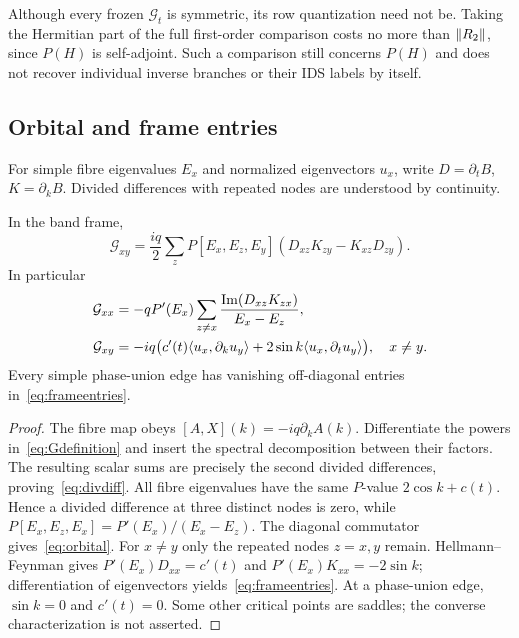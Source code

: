 Although every frozen $\mathcal G_t$ is symmetric, its row quantization need not be. Taking the Hermitian part of the full first-order comparison costs no more than $\lVert R_2\rVert$, since $P(H)$ is self-adjoint. Such a comparison still concerns $P(H)$ and does not recover individual inverse branches or their IDS labels by itself.

\subsection{Orbital and frame entries}
For simple fibre eigenvalues $E_x$ and normalized eigenvectors $u_x$, write $D=\partial_tB$, $K=\partial_kB$. Divided differences with repeated nodes are understood by continuity.

\begin{proposition}\label{prop:symbol}
In the band frame,
\begin{equation}\label{eq:divdiff}
 \mathcal G_{xy}=\frac{iq}{2}\sum_zP[E_x,E_z,E_y]
                    (D_{xz}K_{zy}-K_{xz}D_{zy}).
\end{equation}
In particular
\begin{align}
 \mathcal G_{xx}
 &=-qP'(E_x)\sum_{z\ne x}
        \frac{\operatorname{Im}(D_{xz}K_{zx})}{E_x-E_z},
 \label{eq:orbital}\\
 \mathcal G_{xy}
 &=-iq\bigl(c'(t)\langle u_x,\partial_ku_y\rangle
       +2\sin k\langle u_x,\partial_tu_y\rangle\bigr),\quad x\ne y.
 \label{eq:frameentries}
\end{align}
Every simple phase-union edge has vanishing off-diagonal entries in~\eqref{eq:frameentries}.
\end{proposition}
\begin{proof}
The fibre map obeys $[A,X](k)=-iq\partial_kA(k)$. Differentiate the powers in~\eqref{eq:Gdefinition} and insert the spectral decomposition between their factors. The resulting scalar sums are precisely the second divided differences, proving~\eqref{eq:divdiff}. All fibre eigenvalues have the same $P$-value $2\cos k+c(t)$. Hence a divided difference at three distinct nodes is zero, while
$P[E_x,E_z,E_x]=P'(E_x)/(E_x-E_z)$.
The diagonal commutator gives~\eqref{eq:orbital}. For $x\ne y$ only the repeated nodes $z=x,y$ remain. Hellmann--Feynman gives
$P'(E_x)D_{xx}=c'(t)$ and $P'(E_x)K_{xx}=-2\sin k$; differentiation of eigenvectors yields~\eqref{eq:frameentries}. At a phase-union edge, $\sin k=0$ and $c'(t)=0$. Some other critical points are saddles; the converse characterization is not asserted.
\end{proof}

